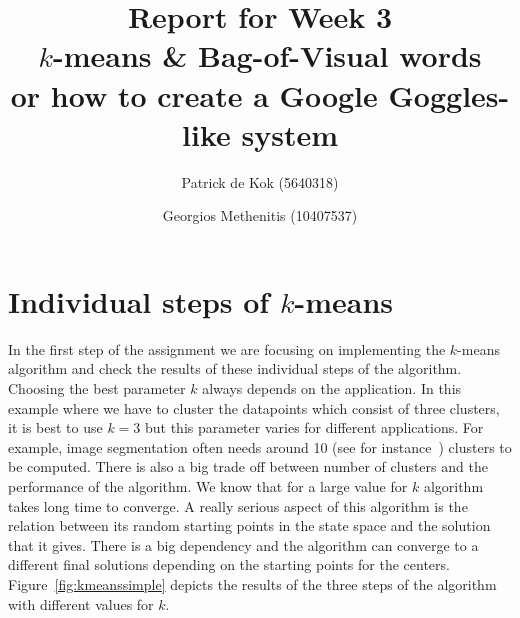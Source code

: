 \documentclass[a4paper,10pt,twoside]{article}
\title{Report for Week 3 \\\normalsize $k$-means \& Bag-of-Visual words\\ or how to create a Google Goggles-like system}
\author{Patrick de Kok (5640318) \and Georgios Methenitis (10407537)}
\begin{document}
\maketitle
\thispagestyle{empty}

\section{Individual steps of $k$-means}
In the first step of the assignment we are focusing on implementing the $k$-means algorithm and check the results of these individual steps of the algorithm. Choosing the best parameter $k$ always depends on the application. In this example where we have to cluster the datapoints which consist of three clusters, it is best to use $k=3$ but this parameter varies for different applications. For example, image segmentation often needs around 10 (see for instance~\cite{Methenitis2013}) clusters to be computed. There is also a big trade off between number of clusters and the performance of the algorithm. We know that for a large value for $k$ algorithm takes long time to converge.
A really serious aspect of this algorithm is the relation between its random starting points in the state space and the solution that it gives. There is a big dependency and the algorithm can converge to a different final solutions depending on the starting points for the centers. Figure~\ref{fig:kmeanssimple} depicts the results of the three steps of the algorithm with different values for $k$.
\end{document}
